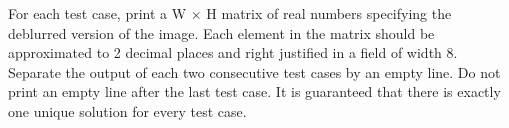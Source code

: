 For each test case, print a W × H matrix of real numbers specifying the deblurred version of the image. Each element in the matrix should be approximated to 2 decimal places and right justified in a field of width 8. Separate the output of each two consecutive test cases by an empty line. Do not print an empty line after the last test case. It is guaranteed that there is exactly one unique solution for every test case.  

\